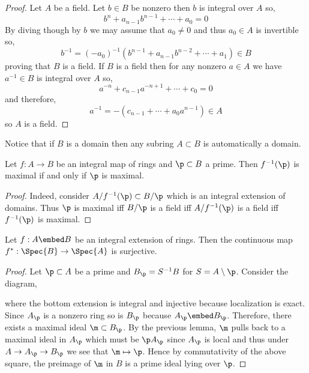 \documentclass[12pt]{article}
\begin{document}
\begin{proof}
Let $A$ be a field. Let $b \in B$ be nonzero then $b$ is integral over $A$ so,
\[ b^n + a_{n-1} b^{n-1} + \cdots + a_0 = 0 \]
By diving though by $b$ we may assume that $a_0 \neq 0$ and thus $a_0 \in A$ is invertible so,
\[ b^{-1} = (-a_0)^{-1} (b^{n-1} + a_{n-1} b^{n-2} + \cdots + a_1) \in B \]
proving that $B$ is a field. If $B$ is a field then for any nonzero $a \in A$ we have $a^{-1} \in B$ is integral over $A$ so,
\[ a^{-n} + c_{n-1} a^{-n+1} + \cdots + c_0 = 0 \]
and therefore,
\[ a^{-1} = -(c_{n-1} + \cdots + a_0 a^{n-1}) \in A \]
so $A$ is a field.
\end{proof}

\begin{rmk}
Notice that if $B$ is a domain then any subring $A \subset B$ is automatically a domain. 
\end{rmk}

\begin{lemma}
Let $f : A \to B$ be an integral map of rings and $\p \subset B$ a prime. Then $f^{-1}(\p)$ is maximal if and only if $\p$ is maximal.
\end{lemma}

\begin{proof}
Indeed, consider $A / f^{-1}(\p) \subset B / \p$ which is an integral extension of domains. Thus $\p$ is maximal iff $B / \p$ is a field iff $A / f^{-1}(\p)$ is a field iff $f^{-1}(\p)$ is maximal.
\end{proof}

\begin{prop}
Let $f : A \embed B$ be an integral extension of rings. Then the continuous map $f^* : \Spec{B} \to \Spec{A}$ is surjective.
\end{prop}

\begin{proof}
Let $\p \subset A$ be a prime and $B_\p = S^{-1} B$ for $S = A \setminus \p$. Consider the diagram,
\begin{center}
\end{center}
where the bottom extension is integral and injective because localization is exact. Since $A_\p$ is a nonzero ring so is $B_\p$ because $A_\p \embed B_\p$. Therefore, there exists a maximal ideal $\m \subset B_\p$. By the previous lemma, $\m$ pulls back to a maximal ideal in $A_\p$ which must be $\p A_\p$ since $A_\p$ is local and thus under $A \to A_\p \to B_\p$ we see that $\m \mapsto \p$. Hence by commutativity of the above square, the preimage of $\m$ in $B$ is a prime ideal lying over $\p$.
\end{proof}
\end{document}
